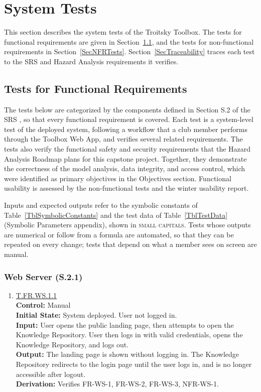 \documentclass[12pt, titlepage]{article}
\newcommand{\testdef}[1]{\leavevmode\hypertarget{test:#1}{}\hyperlink{trace:#1}{#1}}
\begin{document}
\section{System Tests}

This section describes the system tests of the Troitsky Toolbox. The tests for
functional requirements are given in Section~\ref{SecFRTests}, and the tests for
non-functional requirements in Section~\ref{SecNFRTests}. Section~\ref{SecTraceability}
traces each test to the SRS and Hazard Analysis requirements it verifies.

\subsection{Tests for Functional Requirements} \label{SecFRTests}

The tests below are categorized by the components defined in Section S.2 of the
SRS \citep{TroitskySRS}, so that every functional requirement is covered. Each
test is a system-level test of the deployed system, following a workflow that a
club member performs through the Toolbox Web App, and verifies several related
requirements. The tests also verify the functional safety and security
requirements that the Hazard Analysis Roadmap \citep{TroitskyHazardAnalysis}
plans for this capstone project. Together, they demonstrate the correctness of the model analysis,
data integrity, and access control, which were identified as primary objectives in the
Objectives section. Functional usability is assessed by the non-functional
tests and the winter usability report.

Inputs and expected outputs refer to the symbolic constants of
Table~\ref{TblSymbolicConstants} and the test data of Table~\ref{TblTestData}
(Symbolic Parameters appendix), shown in \textsc{small capitals}. Tests whose
outputs are numerical or follow from a formula are automated, so that they can be
repeated on every change; tests that depend on what a member sees on screen are
manual.

\subsubsection{Web Server (S.2.1)}

\begin{enumerate}

\item \testdef{T.FR.WS.1.1}\\
\textbf{Control:} Manual\\
\textbf{Initial State:} System deployed. User not logged in.\\
\textbf{Input:} User opens the public landing page, then attempts to open the
Knowledge Repository. User then logs in with valid credentials, opens the
Knowledge Repository, and logs out.\\
\textbf{Output:} The landing page is shown without logging in. The Knowledge
Repository redirects to the login page until the user logs in, and is no longer
accessible after logout.\\
\textbf{Derivation:} Verifies FR-WS-1, FR-WS-2, FR-WS-3, NFR-WS-1.

\end{enumerate}
\end{document}
